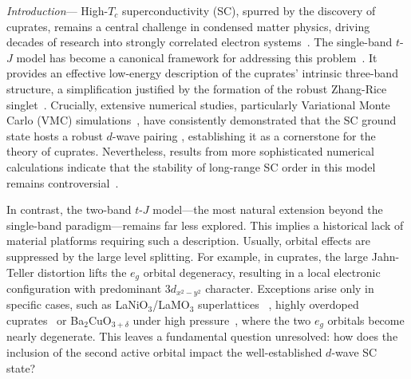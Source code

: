 \documentclass[reprint,superscriptaddress,amsmath,amssymb,aps,twocolumn]{revtex4-1}
\begin{document}
\maketitle

{\color{blue} \em Introduction}---
High-$T_c$ superconductivity (SC), spurred by the discovery of cuprates, remains a central challenge in condensed matter physics, driving decades of research into strongly correlated electron systems~\cite{2004Zhang, 2006Wen, 2015Zaanen}. The single-band $t$-$J$ model has become a canonical framework for addressing this problem~\cite{1988Rice,2006Wen, 2008Fukuyama}. It provides an effective low-energy description of the cuprates' intrinsic three-band structure, a simplification justified by the formation of the robust Zhang-Rice singlet~\cite{1988Rice}. Crucially, extensive numerical studies, particularly Variational Monte Carlo (VMC) simulations~\cite{1988Shibaa, 1988Shibab, 1989Gros, 1999Ogata, 1991Lhuillier, 1996Ogata, 2001Trivedi, 2003Himeda, 2004Trivedi, 2004Lee}, have consistently demonstrated that the SC ground state hosts a robust $d$-wave pairing \cite{Tsuei_RevModPhys.72.969}, establishing it as a cornerstone for the theory of cuprates. Nevertheless, results from more sophisticated numerical calculations indicate that the stability of long-range SC order in this model remains controversial~\cite{White1998,Corboz2014,Zheng2017,Qin2020}.

In contrast, the two-band $t$-$J$ model---the most natural extension beyond the single-band paradigm---remains far less explored. This implies a historical lack of material platforms requiring such a description. 
Usually, orbital effects are suppressed by the large level splitting. For example, in cuprates, the large Jahn-Teller distortion lifts the $e_g$ orbital degeneracy, resulting in a local electronic configuration with predominant $3d_{x^2-y^2}$ character. Exceptions arise only in specific cases, such as LaNiO$_3$/LaMO$_3$ superlattices ~\cite{2008Khaliullin}, highly overdoped cuprates~\cite{2016Xue, 2018Jiang} or Ba$_2$CuO$_{3+\delta}$ under high pressure~\cite{2019Jin}, where the two $e_g$ orbitals become nearly degenerate. This leaves a fundamental question unresolved: how does the inclusion of the second active orbital impact the well-established $d$-wave SC state?
\end{document}
